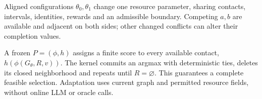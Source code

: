 Aligned configurations $\theta_0,\theta_1$ change one resource parameter,
sharing contacts, intervals, identities, rewards and an admissible boundary.
Competing $a,b$ are available and adjacent on both sides; other changed
conflicts can alter their completion values.

A frozen $P=(\phi,h)$ assigns a finite score to every available contact,
$h(\phi(G_\theta,R,v))$. The kernel commits an argmax with deterministic ties,
deletes its closed neighborhood and repeats until $R=\varnothing$.
This guarantees a complete feasible selection. Adaptation uses current graph
and permitted resource fields, without online LLM or oracle calls.
